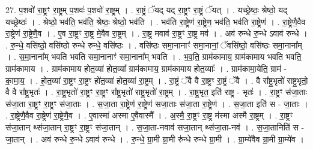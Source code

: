 \documentclass[17pt]{extarticle}
\begin{document}
27. प॒शवो॑ रा॒ष्ट्रꣳ रा॒ष्ट्रम् प॒शवः॑ प॒शवो॑ रा॒ष्ट्रम् । . रा॒ष्ट्रं ॅयद् यद् रा॒ष्ट्रꣳ रा॒ष्ट्रं ॅयत् । . यच्छ्रेष्ठः॒ श्रेष्ठो॒ यद् यच्छ्रेष्ठः॑ । . श्रेष्ठो॒ भव॑ति॒ भव॑ति॒ श्रेष्ठः॒ श्रेष्ठो॒ भव॑ति । . भव॑ति रा॒ष्ट्रेण॑ रा॒ष्ट्रेण॒ भव॑ति॒ भव॑ति रा॒ष्ट्रेण॑ । . रा॒ष्ट्रेणै॒वैव रा॒ष्ट्रेण॑ रा॒ष्ट्रेणै॒व । . ए॒व रा॒ष्ट्रꣳ रा॒ष्ट्र मे॒वैव रा॒ष्ट्रम् । . रा॒ष्ट्र मवाव॑ रा॒ष्ट्रꣳ रा॒ष्ट्र मव॑ । . अव॑ रुन्धे रु॒न्धे ऽवाव॑ रुन्धे । . रु॒न्धे॒ वसि॑ष्ठो॒ वसि॑ष्ठो रुन्धे रुन्धे॒ वसि॑ष्ठः । . वसि॑ष्ठः समा॒नानाꣳ॑ समा॒नानां॒ ॅवसि॑ष्ठो॒ वसि॑ष्ठः समा॒नाना᳚म् । . स॒मा॒नाना᳚म् भवति भवति समा॒नानाꣳ॑ समा॒नाना᳚म् भवति । . भ॒व॒ति॒ ग्राम॑कामाय॒ ग्राम॑कामाय भवति भवति॒ ग्राम॑कामाय । . ग्राम॑कामाय होत॒व्या॑ होत॒व्या᳚ ग्राम॑कामाय॒ ग्राम॑कामाय होत॒व्याः᳚ । . ग्राम॑कामा॒येति॒ ग्राम॑ - का॒मा॒य॒ । . हो॒त॒व्या॑ रा॒ष्ट्रꣳ रा॒ष्ट्रꣳ हो॑त॒व्या॑ होत॒व्या॑ रा॒ष्ट्रम् । . रा॒ष्ट्रं ॅवै वै रा॒ष्ट्रꣳ रा॒ष्ट्रं ॅवै । . वै रा᳚ष्ट्र॒भृतो॑ राष्ट्र॒भृतो॒ वै वै रा᳚ष्ट्र॒भृतः॑ । . रा॒ष्ट्र॒भृतो॑ रा॒ष्ट्रꣳ रा॒ष्ट्रꣳ रा᳚ष्ट्र॒भृतो॑ राष्ट्र॒भृतो॑ रा॒ष्ट्रम् । . रा॒ष्ट्र॒भृत॒ इति॑ राष्ट्र - भृतः॑ । . रा॒ष्ट्रꣳ स॑जा॒ताः स॑जा॒ता रा॒ष्ट्रꣳ रा॒ष्ट्रꣳ स॑जा॒ताः । . स॒जा॒ता रा॒ष्ट्रेण॑ रा॒ष्ट्रेण॑ सजा॒ताः स॑जा॒ता रा॒ष्ट्रेण॑ । . स॒जा॒ता इति॑ स - जा॒ताः । . रा॒ष्ट्रेणै॒वैव रा॒ष्ट्रेण॑ रा॒ष्ट्रेणै॒व । . ए॒वास्मा॑ अस्मा ए॒वैवास्मै᳚ । . अ॒स्मै॒ रा॒ष्ट्रꣳ रा॒ष्ट्र म॑स्मा अस्मै रा॒ष्ट्रम् । . रा॒ष्ट्रꣳ स॑जा॒तान् थ्स॑जा॒तान् रा॒ष्ट्रꣳ रा॒ष्ट्रꣳ स॑जा॒तान् । . स॒जा॒ता-नवाव॑ सजा॒तान् थ्स॑जा॒ता-नव॑ । . स॒जा॒तानिति॑ स - जा॒तान् । . अव॑ रुन्धे रु॒न्धे ऽवाव॑ रुन्धे । . रु॒न्धे॒ ग्रा॒मी ग्रा॒मी रु॑न्धे रुन्धे ग्रा॒मी । . ग्रा॒म्ये॑वैव ग्रा॒मी ग्रा॒म्ये॑व । \newline
\end{document}
